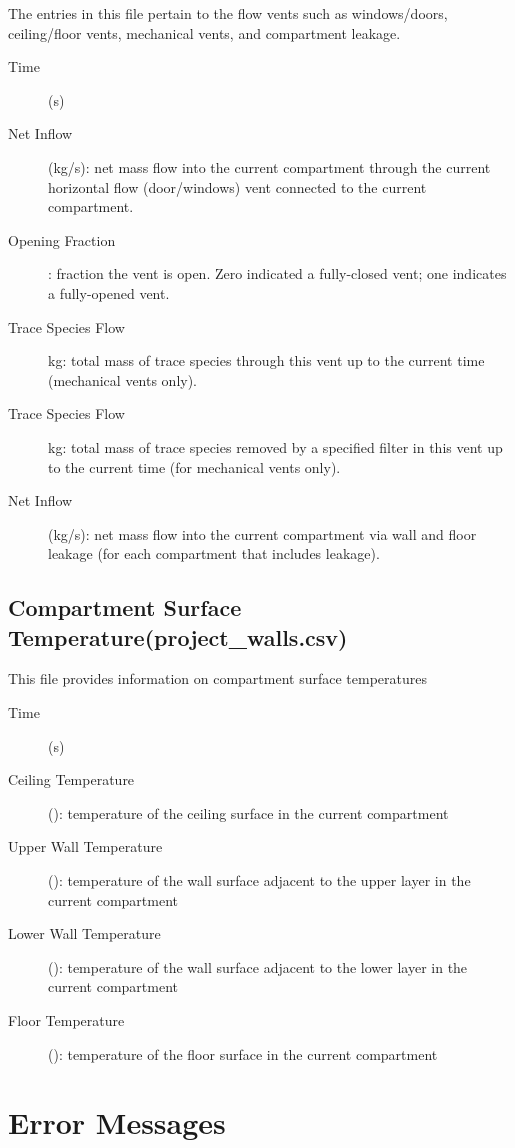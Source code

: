 The entries in this file pertain to the flow vents such as windows/doors, ceiling/floor vents, mechanical vents, and compartment leakage.
\begin{description}
\item[Time] (s)
\item[Net Inflow] (kg/s): net mass flow into the current compartment through the current horizontal flow (door/windows) vent connected to the current compartment.
\item[Opening Fraction]: fraction the vent is open. Zero indicated a fully-closed vent; one indicates a fully-opened vent.
\item[Trace Species Flow] kg: total mass of trace species through this vent up to the current time (mechanical vents only).
\item[Trace Species Flow] kg: total mass of trace species removed by a specified filter in this vent up to the current time (for mechanical vents only).
\item[Net Inflow] (kg/s): net mass flow into the current compartment via wall and floor leakage (for each compartment that includes leakage).
\end{description}

\subsection{Compartment Surface Temperature(project\_walls.csv)}

This file provides information on compartment surface temperatures
\begin{description}
\item[Time] (s)
\item[Ceiling Temperature] (\degc): temperature of the ceiling surface in the current compartment
\item[Upper Wall Temperature] (\degc): temperature of the wall surface adjacent to the upper layer in the current compartment
\item[Lower Wall Temperature] (\degc): temperature of the  wall surface adjacent to the lower layer in the current compartment
\item[Floor Temperature] (\degc): temperature of the floor surface in the current compartment
\end{description}

\newpage

\section{Error Messages}


